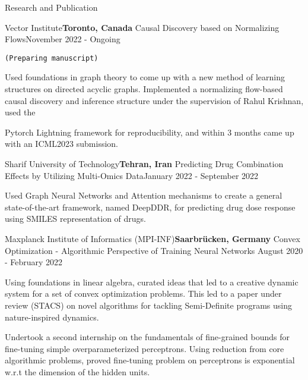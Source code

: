 \documentclass{resume} %
\begin{document}
\begin{rSection}{Research and Publication}

\begin{rSubsection}{Vector Institute}{\textcolor{Black!70}{\bf Toronto, Canada}}
{Causal Discovery based on Normalizing Flows}{\textcolor{Black!70}{November 2022 - Ongoing}}
\item {\tt (Preparing manuscript)}
\begin{small}
\item Used foundations in graph theory to come up with a new method of learning structures on directed acyclic graphs.
Implemented a normalizing flow-based causal discovery and inference structure under the supervision of Rahul Krishnan, used the
\item Pytorch Lightning framework for reproducibility, and within 3 months came up with an ICML2023 submission.
\end{small}
\end{rSubsection}

\begin{rSubsection}{Sharif University of Technology}{\textcolor{Black!70}{\bf Tehran, Iran}}
{Predicting Drug Combination Effects by Utilizing Multi-Omics Data}{\textcolor{Black!70}{January 2022 - September 2022}}
\begin{small}
\item Used Graph Neural Networks and Attention mechanisms to create a general state-of-the-art framework, named DeepDDR, for predicting drug dose response using SMILES representation of drugs.
\end{small}
\end{rSubsection}

\begin{rSubsection}{Maxplanck Institute of Informatics (MPI-INF)}{\textcolor{Black!70}{\bf Saarbrücken, Germany}}
{Convex Optimization - Algorithmic Perspective of Training Neural Networks}
{\textcolor{Black!70}{August 2020 - February 2022}}
\begin{small}
\item Using foundations in linear algebra, curated ideas that led to a creative dynamic system for a set of convex optimization problems. This led to a paper under review (STACS) on novel algorithms for tackling Semi-Definite programs using nature-inspired dynamics.
\item Undertook a second internship on the fundamentals of fine-grained bounds for fine-tuning simple overparameterized perceptrons. Using reduction from core algorithmic problems, proved fine-tuning problem on perceptrons is exponential w.r.t the dimension of the hidden units.
\end{small}
\end{rSubsection}


\end{rSection}
\end{document}
